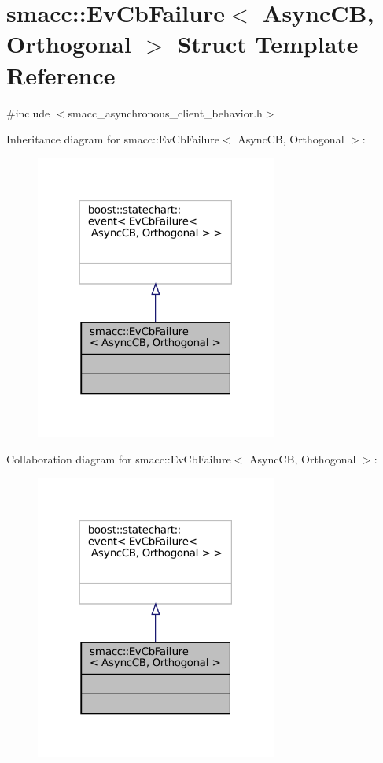 \hypertarget{structsmacc_1_1EvCbFailure}{}\section{smacc\+:\+:Ev\+Cb\+Failure$<$ Async\+CB, Orthogonal $>$ Struct Template Reference}
\label{structsmacc_1_1EvCbFailure}


{\ttfamily \#include $<$smacc\+\_\+asynchronous\+\_\+client\+\_\+behavior.\+h$>$}



Inheritance diagram for smacc\+:\+:Ev\+Cb\+Failure$<$ Async\+CB, Orthogonal $>$\+:
\nopagebreak
\begin{figure}[H]
\begin{center}
\leavevmode
\includegraphics[width=225pt]{structsmacc_1_1EvCbFailure__inherit__graph}
\end{center}
\end{figure}


Collaboration diagram for smacc\+:\+:Ev\+Cb\+Failure$<$ Async\+CB, Orthogonal $>$\+:
\nopagebreak
\begin{figure}[H]
\begin{center}
\leavevmode
\includegraphics[width=225pt]{structsmacc_1_1EvCbFailure__coll__graph}
\end{center}
\end{figure}


